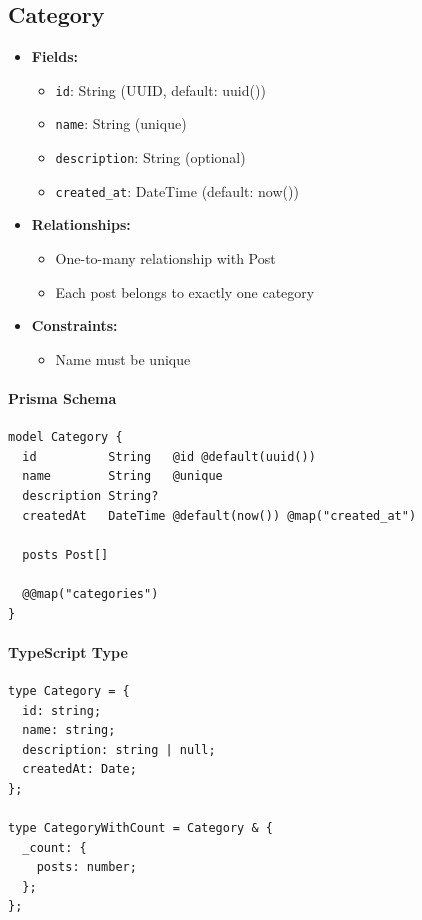 \documentclass[11pt,a4paper]{article}
\begin{document}
\subsection{Category}
\begin{itemize}
    \item \textbf{Fields:}
    \begin{itemize}
        \item \texttt{id}: String (UUID, default: uuid())
        \item \texttt{name}: String (unique)
        \item \texttt{description}: String (optional)
        \item \texttt{created\_at}: DateTime (default: now())
    \end{itemize}
    \item \textbf{Relationships:}
    \begin{itemize}
        \item One-to-many relationship with Post
        \item Each post belongs to exactly one category
    \end{itemize}
    \item \textbf{Constraints:}
    \begin{itemize}
        \item Name must be unique
    \end{itemize}
\end{itemize}

\paragraph{Prisma Schema}
\begin{lstlisting}
model Category {
  id          String   @id @default(uuid())
  name        String   @unique
  description String?
  createdAt   DateTime @default(now()) @map("created_at")
  
  posts Post[]
  
  @@map("categories")
}
\end{lstlisting}

\paragraph{TypeScript Type}
\begin{lstlisting}
type Category = {
  id: string;
  name: string;
  description: string | null;
  createdAt: Date;
};

type CategoryWithCount = Category & {
  _count: {
    posts: number;
  };
};
\end{lstlisting}
\end{document}
